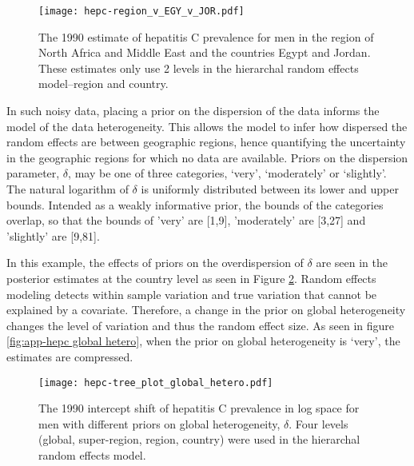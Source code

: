     \begin{figure}[h]
        \begin{center}
            \texttt{[image: hepc-region\_v\_EGY\_v\_JOR.pdf]}
            \caption{The 1990 estimate of hepatitis C prevalence for men in the region of North Africa and Middle East and the countries Egypt and Jordan.  These estimates only use 2 levels in the hierarchal random effects model--region and country.}
            \label{fig:app-hepc regional rfx}
        \end{center}
    \end{figure}

In such noisy data, placing a prior on the dispersion of the data
informs the model of the data heterogeneity.  This allows the model to
infer how dispersed the random effects are between geographic regions,
hence quantifying the uncertainty in the geographic regions for which
no data are available.  Priors on the dispersion parameter, $\delta$,
may be one of three categories, `very', `moderately' or `slightly'.
The natural logarithm of $\delta$ is uniformly distributed between its
lower and upper bounds.  Intended as a weakly informative prior, the
bounds of the categories overlap, so that the bounds of 'very' are
[1,9], 'moderately' are [3,27] and 'slightly' are [9,81].

In this example, the effects of priors on the overdispersion of
$\delta$ are seen in the posterior estimates at the country level as
seen in Figure \ref{fig:app-hepc global hetero}.  Random effects
modeling detects within sample variation and true variation that
cannot be explained by a covariate.  Therefore, a change in the prior
on global heterogeneity changes the level of variation and thus the
random effect size.  As seen in figure \ref{fig:app-hepc global
  hetero}, when the prior on global heterogeneity is `very', the
estimates are compressed.

    \begin{figure}[h]
        \begin{center}
            \texttt{[image: hepc-tree\_plot\_global\_hetero.pdf]}
            \caption{The 1990 intercept shift of hepatitis C
              prevalence in log space for men with different priors on
              global heterogeneity, $\delta$.  Four levels (global,
              super-region, region, country) were used in the
              hierarchal random effects model.}
            \label{fig:app-hepc global hetero}
        \end{center}
    \end{figure}

